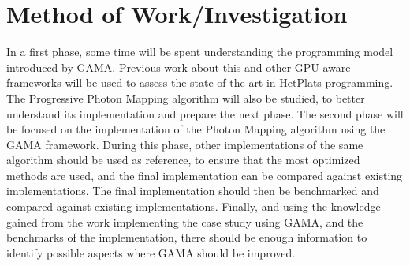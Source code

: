 \section{Method of Work/Investigation}

In a first phase, some time will be spent understanding the programming model introduced by GAMA. Previous work about this and other GPU-aware frameworks will be used to assess the state of the art in HetPlats programming. The Progressive Photon Mapping algorithm will also be studied, to better understand its implementation and prepare the next phase. The second phase will be focused on the implementation of the Photon Mapping algorithm using the GAMA framework. During this phase, other implementations of the same algorithm should be used as reference, to ensure that the most optimized methods are used, and the final implementation can be compared against existing implementations. The final implementation should then be benchmarked and compared against existing implementations. Finally, and using the knowledge gained from the work implementing the case study using GAMA, and the benchmarks of the implementation, there should be enough information to identify possible aspects where GAMA should be improved.
